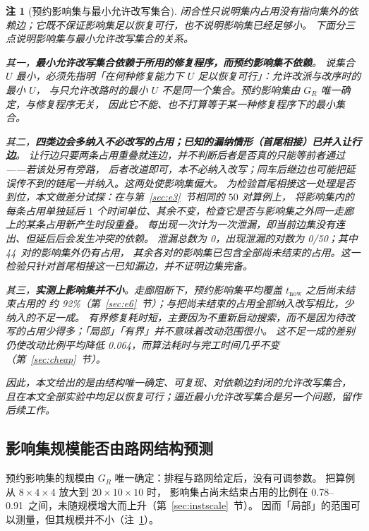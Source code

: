 \documentclass[manuscript,screen,review]{acmart}
\newcommand{\NPairs}{50}
\newcommand{\ClosureAliveFrac}{92\%}
\newcommand{\RAStabMean}{0.064}      %
\newcommand{\ScaleJobsHi}{20}
\newcommand{\ScaleMachHi}{10}
\newcommand{\ScaleCloAliveLo}{0.78}  %
\newcommand{\ScaleCloAliveHi}{0.91}  %
\newcommand{\ProbeLeakPairs}{0/50}
\newcommand{\ProbeLeaks}{0}
\newcommand{\ProbeOutsidePairs}{44}  %
\newtheorem{remark}{注}
\begin{document}
\begin{remark}[预约影响集与最小允许改写集合]
\label{rem:minimality}
闭合性只说明集内占用没有指向集外的依赖边；它既不保证影响集足以恢复可行，也不说明影响集已经足够小。
下面分三点说明影响集与最小允许改写集合的关系。

其一，\textbf{最小允许改写集合依赖于所用的修复程序，而预约影响集不依赖}。
说集合 \(U\) 最小，必须先指明「在何种修复能力下 \(U\) 足以恢复可行」：允许改派与改序时的最小 \(U\)，
与只允许改路时的最小 \(U\) 不是同一个集合。预约影响集由 \(G_R\) 唯一确定，与修复程序无关，
因此它不能、也不打算等于某一种修复程序下的最小集合。

其二，\textbf{四类边会多纳入不必改写的占用；已知的漏纳情形（首尾相接）已并入让行边}。
让行边只要两条占用重叠就连边，并不判断后者是否\emph{真的}只能等前者通过——若该处另有旁路，
后者改道即可，本不必纳入改写；同车后继边也可能把延误传不到的链尾一并纳入。这两处使影响集偏大。
为检验首尾相接这一处理是否到位，本文做\emph{差分试探}：在与第~\ref{sec:e3}~节相同的 \(\NPairs\) 对算例上，
将影响集内的每条占用单独延后 \(1\) 个时间单位、其余不变，检查它是否与影响集之外同一走廊上的某条占用新产生时段重叠。
每出现一次计为一次泄漏，即当前边集没有连出、但延后后会发生冲突的依赖。
泄漏总数为 \ProbeLeaks，出现泄漏的对数为 \ProbeLeakPairs；其中 \ProbeOutsidePairs\ 对的影响集外仍有占用，
其余各对的影响集已包含全部尚未结束的占用。这一检验只针对首尾相接这一已知漏边，并不证明边集完备。

其三，\textbf{实测上影响集并不小}。走廊阻断下，预约影响集平均覆盖 \(t_{\mathrm{now}}\) 之后尚未结束占用的
约 \ClosureAliveFrac（第~\ref{sec:e6}~节）；与把尚未结束的占用全部纳入改写相比，少纳入的不足一成。
有界修复耗时短，主要因为不重新启动搜索，而不是因为待改写的占用少得多；「局部」「有界」并不意味着改动范围很小。
这不足一成的差别仍使改动比例平均降低 \RAStabMean，而算法耗时与完工时间几乎不变（第~\ref{sec:cheap}~节）。

因此，本文给出的是由结构唯一确定、可复现、对依赖边封闭的允许改写集合，
且在本文全部实验中均足以恢复可行；逼近最小允许改写集合是另一个问题，留作后续工作。
\end{remark}

\subsection{影响集规模能否由路网结构预测}
\label{sec:structure}

预约影响集的规模由 \(G_R\) 唯一确定：排程与路网给定后，没有可调参数。
把算例从 \(8\times4\times4\) 放大到 \(\ScaleJobsHi\times\ScaleMachHi\times\ScaleMachHi\) 时，
影响集占尚未结束占用的比例在 \ScaleCloAliveLo--\ScaleCloAliveHi\ 之间，未随规模增大而上升（第~\ref{sec:instscale}~节）。
因而「局部」的范围可以测量，但其规模并不小（注~\ref{rem:minimality}）。
\end{document}
